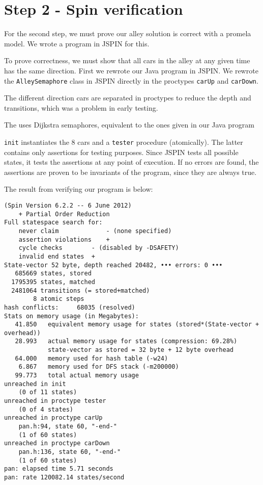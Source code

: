 \section*{Step 2 - Spin verification}
For the second step, we must prove our alley solution is correct with a promela model. We wrote a program in JSPIN for this.

To prove correctness, we must show that all cars in the alley at any given time has the same direction. First we rewrote our Java program in JSPIN. We rewrote the \texttt{AlleySemaphore} class in JSPIN directly in the proctypes \texttt{carUp} and \texttt{carDown}.

The different direction cars are separated in proctypes to reduce the depth and transitions, which was a problem in early testing.

The uses Dijkstra semaphores, equivalent to the ones given in our Java program

\texttt{init} instantiates the 8 cars and a \texttt{tester} procedure (atomically). The latter contains only assertions for testing purposes. Since JSPIN tests all possible states, it tests the assertions at any point of execution. If no errors are found, the assertions are proven to be invariants of the program, since they are always true.

The result from verifying our program is below:
\begin{lstlisting}
(Spin Version 6.2.2 -- 6 June 2012)
	+ Partial Order Reduction
Full statespace search for:
	never claim         	- (none specified)
	assertion violations	+
	cycle checks       	- (disabled by -DSAFETY)
	invalid end states	+
State-vector 52 byte, depth reached 20482, ••• errors: 0 •••
   685669 states, stored
  1795395 states, matched
  2481064 transitions (= stored+matched)
        8 atomic steps
hash conflicts:     68035 (resolved)
Stats on memory usage (in Megabytes):
   41.850	equivalent memory usage for states (stored*(State-vector + overhead))
   28.993	actual memory usage for states (compression: 69.28%)
         	state-vector as stored = 32 byte + 12 byte overhead
   64.000	memory used for hash table (-w24)
    6.867	memory used for DFS stack (-m200000)
   99.773	total actual memory usage
unreached in init
	(0 of 11 states)
unreached in proctype tester
	(0 of 4 states)
unreached in proctype carUp
	pan.h:94, state 60, "-end-"
	(1 of 60 states)
unreached in proctype carDown
	pan.h:136, state 60, "-end-"
	(1 of 60 states)
pan: elapsed time 5.71 seconds
pan: rate 120082.14 states/second
\end{lstlisting}

